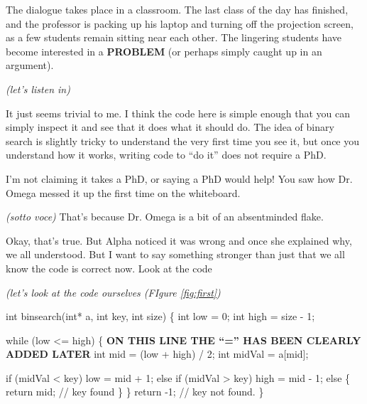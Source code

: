 \documentclass[sigplan]{acmart}
\begin{document}
The dialogue takes place in a classroom.  The last class of the day has finished, and the professor is packing up his laptop and turning off the projection screen, as a few students remain sitting near each other.  The lingering students have become interested in a {\bf PROBLEM} (or perhaps simply caught up in an argument).

\vspace{0.1in}

\emph{(let's listen in)}

\vspace{0.1in}

  It just seems trivial to me.  I think the code here is simple enough that you can simply inspect it and see that it does what it should do.  The idea of binary search is slightly tricky to understand the very first time you see it, but once you understand how it works, writing code to ``do it'' does not require a PhD.

\vspace{0.1in}

  I'm not claiming it takes a PhD, or saying a PhD would help!  You saw how Dr. Omega messed it up the first time on the whiteboard.

\vspace{0.1in}

 \emph{(sotto voce)} That's because
Dr. Omega is a bit of an absentminded flake.

\vspace{0.1in}

  Okay, that's true.  But Alpha noticed it
was wrong and once she explained why, we all understood.  But I want
to say something stronger than just that we all know the code is
correct now.  Look at the code

\vspace{0.1in}

\noindent \emph{(let's look at the code ourselves (FIgure \ref{fig:first})}

\begin{figure*}
  \begin{code}
int binsearch(int* a, int key, int size) \{
  int low = 0;
  int high = size - 1;
  
  while (low <= high) \{ {\bf ON THIS LINE THE ``='' HAS BEEN CLEARLY ADDED LATER}
    int mid = (low + high) / 2;
    int midVal = a[mid];

    if (midVal < key)
      low = mid + 1;
    else if (midVal > key)
      high = mid - 1;
    else \{
      return mid; // key found
    \}
  \}
  return -1;  // key not found.
\}
\end{code}
\caption{C Code on the Whiteboard at the End of Class}
\label{fig:first}
\end{figure*}
\end{document}
